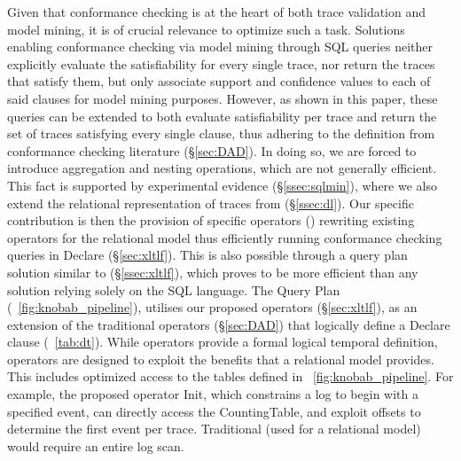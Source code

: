 Given that conformance checking is at the heart of both trace validation and model mining, it is of crucial relevance to optimize such a task.
Solutions enabling conformance checking via model mining through SQL queries \cite{Schonig15,SchonigRCJM16}  neither explicitly evaluate the satisfiability for every single trace, nor return the traces that satisfy them, but only associate support and confidence values to each of said clauses for model mining purposes. However, as shown in this paper,  these queries can be extended to both 
evaluate satisfiability per trace and return the set of traces satisfying every single clause, thus adhering to the definition from conformance checking literature (\S\ref{sec:DAD}). In doing so,  we are forced to introduce  aggregation and nesting operations, which are not generally efficient. This fact is supported by experimental evidence (\S\ref{ssec:sqlmin}), where we also extend the relational representation of traces from \cite{Schonig15,SchonigRCJM16} (\S\ref{ssec:dl}). Our specific contribution is then the provision of specific operators (\xLTLf) rewriting existing \LTLf operators for the relational  model thus efficiently running conformance checking queries in Declare (\S\ref{sec:xltlf}). This is also possible through a query plan solution similar to  \cite{BellatrecheKB21} (\S\ref{ssec:xltlf}), which  proves to be more efficient than any solution relying solely on the SQL language. {The Query Plan (\figurename~\ref{fig:knobab_pipeline}), utilises our proposed \xLTLf operators (\S\ref{sec:xltlf}), as an extension of the traditional \LTLf operators (\S\ref{sec:DAD}) that logically define a Declare clause (\tablename~\ref{tab:dt}). While \LTLf operators provide a formal logical temporal definition, \xLTLf operators are designed to exploit the benefits that a relational model provides. This includes optimized access to the tables defined in \figurename~\ref{fig:knobab_pipeline}. For example, the proposed operator \textsf{Init}, which constrains a log to begin with a specified event, can directly access the \textsf{CountingTable}, and exploit offsets to determine the first event per trace. Traditional \LTLf (used for a relational model) would require an entire log scan. }

